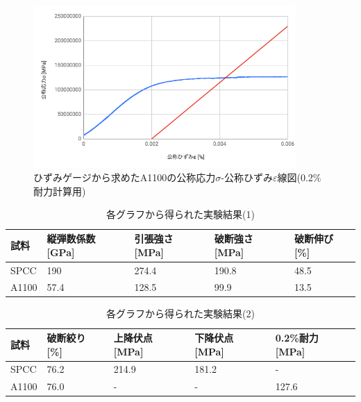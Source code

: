 \documentclass[a4paper,11pt,uplatex]{jsarticle}
\begin{document}
\begin{figure}[H]
      \begin{center}
        \includegraphics[width = 10cm]{画像/耐力.png}
        \caption{ひずみゲージから求めたA1100の公称応力$\sigma$-公称ひずみ$\varepsilon$線図(0.2\%耐力計算用)}
        \label{0.2耐力}
      \end{center}
\end{figure}


\begin{table}[H]
\begin{center}
\caption{各グラフから得られた実験結果(1)}
\label{実験結果1}
  \begin{tabular}{|l|l|l|l|l|}
  \hline
  試料    & 縦弾数係数 [GPa] & 引張強さ [MPa] & 破断強さ [MPa] & 破断伸び [\%] \\ \hline
  SPCC  & 190             & 274.4          & 190.8          & 48.5          \\
  A1100 & 57.4            & 128.5          & 99.9           & 13.5          \\ \hline
  \end{tabular}
\end{center}
\end{table}

\begin{table}[H]
\begin{center}
  \caption{各グラフから得られた実験結果(2)}
  \label{実験結果2}
  \begin{tabular}{|l|l|l|l|l|}
  \hline
  試料    & 破断絞り [\%]& 上降伏点 [MPa]& 下降伏点 [MPa]& 0.2\%耐力 [MPa]\\ \hline
  SPCC  & 76.2 & 214.9 & 181.2 & -       \\
  A1100 & 76.0 & -     & -     & 127.6   \\ \hline
  \end{tabular}
\end{center}
\end{table}
\end{document}
